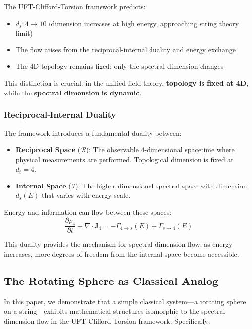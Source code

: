 \documentclass[UTF8]{ctex}\n\documentclass[12pt,a4paper]{article}
\begin{document}
The UFT-Clifford-Torsion framework predicts:
\begin{itemize}
    \item $d_s: 4 \to 10$ (dimension increases at high energy, approaching string theory limit)
    \item The flow arises from the reciprocal-internal duality and energy exchange
    \item The 4D topology remains fixed; only the spectral dimension changes
\end{itemize}

This distinction is crucial: in the unified field theory, \textbf{topology is fixed at 4D}, while the \textbf{spectral dimension is dynamic}.

\subsubsection{Reciprocal-Internal Duality}

The framework introduces a fundamental duality between:
\begin{itemize}
    \item \textbf{Reciprocal Space} ($\mathcal{R}$): The observable 4-dimensional spacetime where physical measurements are performed. Topological dimension is fixed at $d_t = 4$.
    \item \textbf{Internal Space} ($\mathcal{I}$): The higher-dimensional spectral space with dimension $d_s(E)$ that varies with energy scale.
\end{itemize}

Energy and information can flow between these spaces:
\begin{equation}
    \frac{\partial \rho_4}{\partial t} + \nabla \cdot \mathbf{J}_4 = -\Gamma_{4 \to s}(E) + \Gamma_{s \to 4}(E)
\end{equation}

This duality provides the mechanism for spectral dimension flow: as energy increases, more degrees of freedom from the internal space become accessible.

\subsection{The Rotating Sphere as Classical Analog}

In this paper, we demonstrate that a simple classical system---a rotating sphere on a string---exhibits mathematical structures isomorphic to the spectral dimension flow in the UFT-Clifford-Torsion framework. Specifically:
\end{document}

